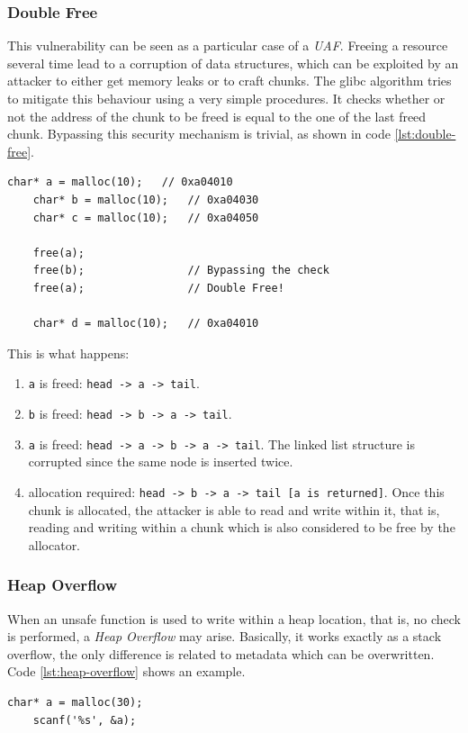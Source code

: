 \documentclass{article}
\numberwithin{equation}{subsection}
\begin{document}
\subsubsection{Double Free}
This vulnerability can be seen as a particular case of a \emph{UAF}. Freeing a resource several time lead to a corruption of data structures, which can be exploited by an attacker to either get memory leaks or to craft chunks. The glibc algorithm tries to mitigate this behaviour using a very simple procedures. It checks whether or not the address of the chunk to be freed is equal to the one of the last freed chunk. Bypassing this security mechanism is trivial, as shown in code \ref{lst:double-free}.\newline
\begin{minipage}{\textwidth}
\centering
    \lstset{style=cstyle}
    \begin{lstlisting}[caption={Double Free vulnerable code.},captionpos=b,label={lst:double-free}]
    char* a = malloc(10);   // 0xa04010
    char* b = malloc(10);   // 0xa04030
    char* c = malloc(10);   // 0xa04050
    
    free(a);
    free(b);                // Bypassing the check
    free(a);                // Double Free!
    
    char* d = malloc(10);   // 0xa04010
\end{lstlisting}
\end{minipage}
\noindent
This is what happens:
\begin{enumerate}
    \item \texttt{a} is freed: \texttt{head -> a -> tail}.
    \item \texttt{b} is freed: \texttt{head -> b -> a -> tail}.
    \item \texttt{a} is freed: \texttt{head -> a ->  b -> a -> tail}. The linked list structure is corrupted since the same node is inserted twice.
    \item allocation required: \texttt{head ->  b -> a -> tail [a is returned]}. Once this chunk is allocated, the attacker is able to read and write within it, that is, reading and writing within a chunk which is also considered to be free by the allocator.
\end{enumerate}
\subsubsection{Heap Overflow}
When an unsafe function is used to write within a heap location, that is, no check is performed, a \emph{Heap Overflow} may arise. Basically, it works exactly as a stack overflow, the only difference is related to metadata which can be overwritten. Code \ref{lst:heap-overflow} shows an example.\newline
\begin{minipage}{\textwidth}
\centering
    \lstset{style=cstyle}
    \begin{lstlisting}[caption={Double Free vulnerable code.},captionpos=b,label={lst:heap-overflow}]
    char* a = malloc(30);
    scanf('%s', &a);
\end{lstlisting}
\end{minipage}
\end{document}
